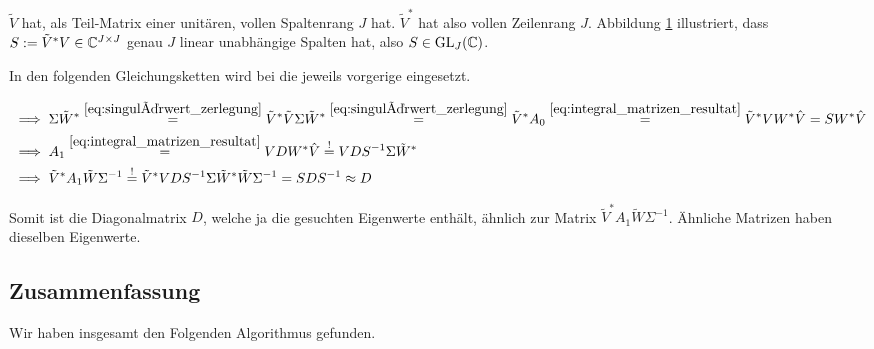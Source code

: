 $\tilde V$ hat, als Teil-Matrix einer unitären, vollen Spaltenrang $J$ hat.
$\tilde V^\ast$ hat also vollen Zeilenrang $J$.
Abbildung \ref{fig:rang_2} illustriert, dass $S := \tilde V^\ast V \in \mathbb{C}^{J \times J}$ genau $J$ linear unabhängige Spalten hat, also $S \in \operatorname{GL}_J(\mathbb{C})$.

\begin{figure}[!ht]
    \centering
    \caption{}
    \label{fig:rang_2}
\end{figure}

In den folgenden Gleichungsketten wird bei \Quote{!} die jeweils vorgerige eingesetzt.

\begin{align*}
    & \implies
    \Sigma \tilde W^\ast
    \stackrel
    {
        \eqref{eq:singulärwert_zerlegung}
    }{=}
    \tilde V^\ast \tilde V \Sigma \tilde W^\ast
    \stackrel
    {
        \eqref{eq:singulärwert_zerlegung}
    }{=}
    \tilde V^\ast A_0
    \stackrel
    {
        \eqref{eq:integral_matrizen_resultat}
    }{=}
    \tilde V^\ast V W^\ast \hat V
    =
    S W^\ast \hat V \\
    & \implies
    A_1
    \stackrel
    {
        \eqref{eq:integral_matrizen_resultat}
    }{=}
    V D W^\ast \hat V
    \stackrel{!}{=}
    V D S^{-1} \Sigma \tilde W^\ast \\
    & \implies
    \tilde V^\ast A_1 \tilde W \Sigma^{-1}
    \stackrel{!}{=}
    \tilde V^\ast V D S^{-1} \Sigma \tilde W^\ast \tilde W \Sigma^{-1}
    =
    S D S^{-1}
    \approx
    D
\end{align*}

Somit ist die Diagonalmatrix $D$, welche ja die gesuchten Eigenwerte enthält, ähnlich zur Matrix $\tilde V^\ast A_1 \tilde W \Sigma^{-1}$.
Ähnliche Matrizen haben dieselben Eigenwerte.

\subsection*{Zusammenfassung}

Wir haben insgesamt den Folgenden Algorithmus gefunden.